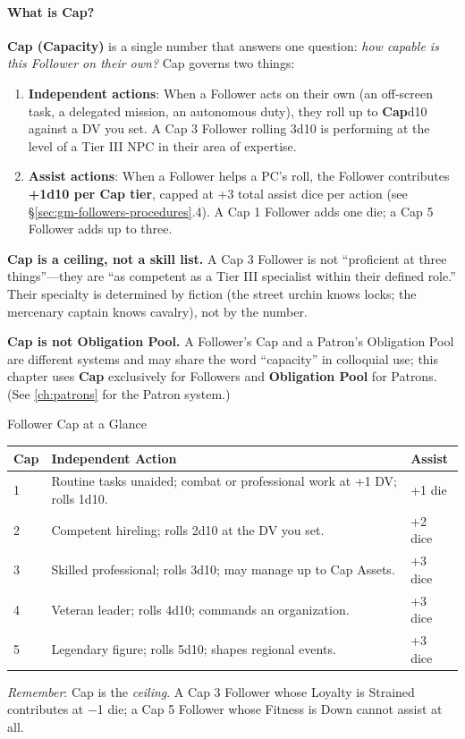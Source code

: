\paragraph{What is Cap?}
\textbf{Cap (Capacity)} is a single number that answers one question: \emph{how capable is this Follower on their own?} Cap governs two things:

\begin{enumerate}
  \item \textbf{Independent actions}: When a Follower acts on their own (an off-screen task, a delegated mission, an autonomous duty), they roll up to \textbf{Cap}d10 against a DV you set. A Cap 3 Follower rolling 3d10 is performing at the level of a Tier III NPC in their area of expertise.
  \item \textbf{Assist actions}: When a Follower helps a PC's roll, the Follower contributes \textbf{+1d10 per Cap tier}, capped at +3 total assist dice per action (see §\ref{sec:gm-followers-procedures}.4). A Cap 1 Follower adds one die; a Cap 5 Follower adds up to three.
\end{enumerate}

\textbf{Cap is a ceiling, not a skill list.} A Cap 3 Follower is not ``proficient at three things''---they are ``as competent as a Tier III specialist within their defined role.'' Their specialty is determined by fiction (the street urchin knows locks; the mercenary captain knows cavalry), not by the number.

\textbf{Cap is not Obligation Pool.} A Follower's Cap and a Patron's Obligation Pool are different systems and may share the word ``capacity'' in colloquial use; this chapter uses \textbf{Cap} exclusively for Followers and \textbf{Obligation Pool} for Patrons. (See \ref{ch:patrons} for the Patron system.)

\begin{gmtable}{Follower Cap at a Glance}
\centering
\small
\begin{tabularx}{\linewidth}{@{}lXl@{}}
\toprule
\textbf{Cap} & \textbf{Independent Action} & \textbf{Assist} \\
\midrule
1 & Routine tasks unaided; combat or professional work at +1 DV; rolls 1d10. & +1 die \\
2 & Competent hireling; rolls 2d10 at the DV you set. & +2 dice \\
3 & Skilled professional; rolls 3d10; may manage up to Cap Assets. & +3 dice \\
4 & Veteran leader; rolls 4d10; commands an organization. & +3 dice \\
5 & Legendary figure; rolls 5d10; shapes regional events. & +3 dice \\
\bottomrule
\end{tabularx}
\tcblower
\small\textit{Remember}: Cap is the \emph{ceiling}. A Cap 3 Follower whose Loyalty is Strained contributes at −1 die; a Cap 5 Follower whose Fitness is Down cannot assist at all.
\end{gmtable}

